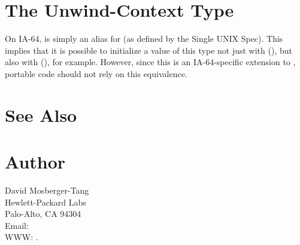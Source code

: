 \documentclass{article}
\begin{document}
\section{The Unwind-Context Type}

On IA-64,  is simply an alias for
 (as defined by the Single UNIX Spec).  This implies
that it is possible to initialize a value of this type not just with
(), but also with (), for
example.  However, since this is an IA-64-specific extension to
, portable code should not rely on this equivalence.


\section{See Also}


\section{Author}

\noindent
David Mosberger-Tang\\
Hewlett-Packard Labs\\
Palo-Alto, CA 94304\\
Email: \\
WWW: .
\LatexManEnd
\end{document}
